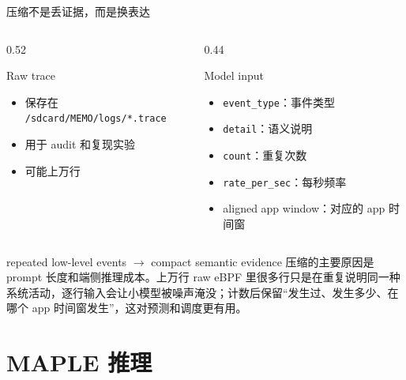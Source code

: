 \documentclass[UTF8,aspectratio=169,10pt]{ctexbeamer}
\newcommand{\code}[1]{\texttt{\small #1}}
\newcommand{\explainfoot}[1]{%
  \vspace{0.35em}
  {\scriptsize\color{memoGray}#1}
}
\begin{document}
\begin{frame}{压缩不是丢证据，而是换表达}
  \begin{columns}[T,totalwidth=\textwidth]
    \begin{column}{0.52\textwidth}
      \begin{block}{Raw trace}
        \begin{itemize}
          \item 保存在 \code{/sdcard/MEMO/logs/*.trace}
          \item 用于 audit 和复现实验
          \item 可能上万行
        \end{itemize}
      \end{block}
    \end{column}
    \begin{column}{0.44\textwidth}
      \begin{block}{Model input}
        \begin{itemize}
          \item \code{event\_type}：事件类型
          \item \code{detail}：语义说明
          \item \code{count}：重复次数
          \item \code{rate\_per\_sec}：每秒频率
          \item aligned app window：对应的 app 时间窗
        \end{itemize}
      \end{block}
    \end{column}
  \end{columns}
  \vspace{0.6em}
  \centering
  \Large repeated low-level events \(\rightarrow\) compact semantic evidence
  \explainfoot{压缩的主要原因是 prompt 长度和端侧推理成本。上万行 raw eBPF 里很多行只是在重复说明同一种系统活动，逐行输入会让小模型被噪声淹没；计数后保留“发生过、发生多少、在哪个 app 时间窗发生”，这对预测和调度更有用。}
\end{frame}

\section{MAPLE 推理}
\end{document}
